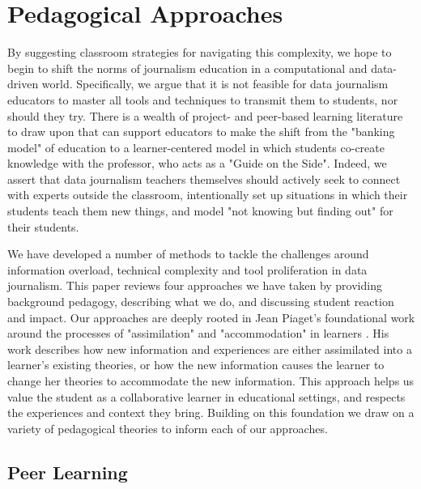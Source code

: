 \documentclass{acm_proc_article-sp}
\begin{document}
\section{Pedagogical Approaches}

By suggesting classroom strategies for navigating this complexity, we hope to begin to shift the norms of journalism education in a computational and data-driven world. Specifically, we argue that it is not feasible for data journalism educators to master all tools and techniques to transmit them to students, nor should they try. There is a wealth of project- and peer-based learning literature to draw upon that can support educators to make the shift from the "banking model" of education \cite{freire_pedagogy_2000} to a learner-centered model\cite{piaget_origins_1952, cullen_learner-centered_2012} in which students co-create knowledge with the professor, who acts as a "Guide on the Side"\cite{king_sage_1993}. Indeed, we assert that data journalism teachers themselves should actively seek to connect with experts outside the classroom, intentionally set up situations in which their students teach them new things, and model "not knowing but finding out" for their students.

We have developed a number of methods to tackle the challenges around information overload, technical complexity and tool proliferation in data journalism.  This paper reviews four approaches we have taken by providing background pedagogy, describing what we do, and discussing student reaction and impact.  Our approaches are deeply rooted in Jean Piaget's foundational work around the processes of "assimilation" and "accommodation" in learners \cite{piaget_origins_1952}. His work describes how new information and experiences are either assimilated into a learner's existing theories, or how the new information causes the learner to change her theories to accommodate the new information.  This approach helps us value the student as a collaborative learner in educational settings, and respects the experiences and context they bring.  Building on this foundation we draw on a variety of pedagogical theories to inform each of our approaches.

\subsection{Peer Learning}
\end{document}
